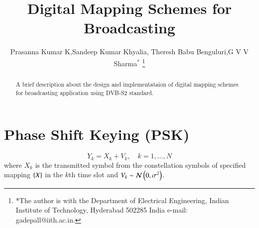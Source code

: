 \documentclass[journal,12pt,twocolumn]{IEEEtran}
\begin{document}


\let\StandardTheFigure\thefigure
\let\StandardTheTable\thetable





\def\putbox#1#2#3{\makebox[0in][l]{\makebox[#1][l]{}\raisebox{\baselineskip}[0in][0in]{\raisebox{#2}[0in][0in]{#3}}}}
     \def\rightbox#1{\makebox[0in][r]{#1}}
     \def\centbox#1{\makebox[0in]{#1}}
     \def\topbox#1{\raisebox{-\baselineskip}[0in][0in]{#1}}
     \def\midbox#1{\raisebox{-0.5\baselineskip}[0in][0in]{#1}}




\title{ 
Digital Mapping Schemes for Broadcasting
}



\author{Prasanna Kumar K,Sandeep Kumar Khyalia, Theresh Babu Benguluri,G V V Sharma$^{*}$%
\thanks{*The author is with the Department
of Electrical Engineering, Indian Institute of Technology, Hyderabad
502285 India e-mail:  gadepall@iith.ac.in.}
}


\maketitle

\tableofcontents

%
\begin{abstract}
\boldmath
A brief description about the design and implementataion of digital mapping schemes for broadcasting application using DVB-S2  \cite{dvb} standard.
\end{abstract}


\section{Phase Shift Keying (PSK)}
\begin{equation}
Y_k= X_k + V_k, \quad k = 1,\dots,N
\end{equation} 
where $X_k$ is the transmitted symbol from the constellation symbols of specified mapping $\left\{X\right\}$ in the $k$th time slot and $V_k \sim \mathcal{N}\left(0,\sigma^2\right) $.
\end{document}
